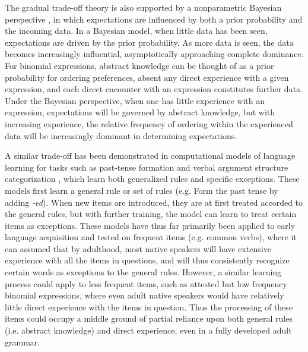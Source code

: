 \documentclass[authoryear]{elsarticle}
\begin{document}
The gradual trade-off theory is also supported by a nonparametric Bayesian perspective \citep[e.g.][]{Goldwater:2009jy,Xu:2007dt}, in which expectations are influenced by both a prior probability and the incoming data. In a Bayesian model, when little data has been seen, expectations are driven by the prior probability. As more data is seen, the data becomes increasingly influential, asymptotically approaching complete dominance. For binomial expressions, abstract knowledge can be thought of as a prior probability for ordering preferences, absent any direct experience with a given expression, and each direct encounter with an expression constitutes further data. Under the Bayesian perspective, when one has little experience with an expression, expectations will be governed by abstract knowledge, but with increasing experience, the relative frequency of ordering within the experienced data will be increasingly dominant in determining expectations.

A similar trade-off has been demonstrated in computational models of language learning for tasks such as past-tense formation \citep{Rumelhart:1986wx} and verbal argument structure categorization \citep{Alishahi:2008kp}, which learn both generalized rules and specific exceptions. These models first learn a general rule or set of rules (e.g. Form the past tense by adding \emph{-ed}). When new items are introduced, they are at first treated accorded to the general rules, but with further training, the model can learn to treat certain items as exceptions. These models have thus far primarily been applied to early language acquisition and tested on frequent items (e.g. common verbs), where it can assumed that by adulthood, most native speakers will have extensive experience with all the items in questions, and will thus consistently recognize certain words as exceptions to the general rules. However, a similar learning process could apply to less frequent items, such as attested but low frequency binomial expressions, where even adult native speakers would have relatively little direct experience with the items in question. Thus the processing of these items could occupy a middle ground of partial reliance upon both general rules (i.e. abstract knowledge) and direct experience, even in a fully developed adult grammar.
\end{document}
